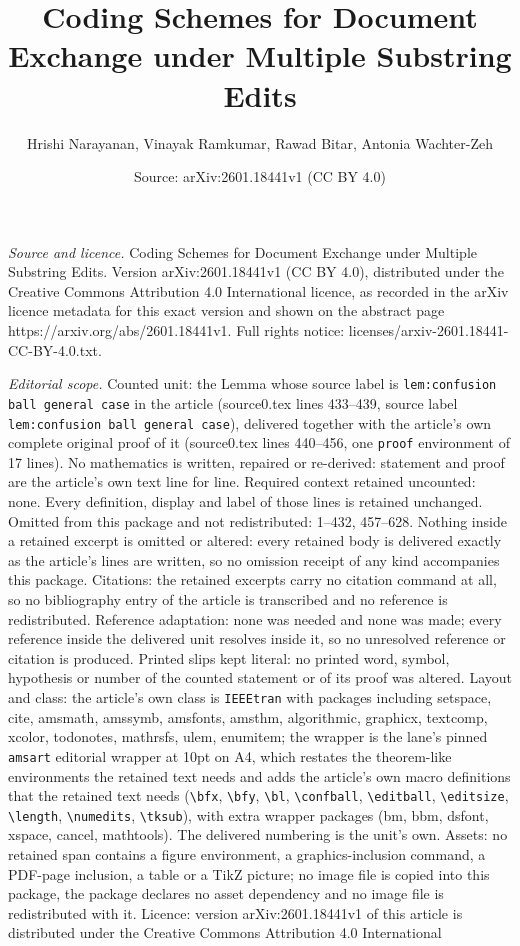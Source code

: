 \documentclass[10pt,a4paper]{amsart}
\title[Coding Schemes for Document Exchange under Multiple Substrin]{Coding Schemes for Document Exchange under Multiple Substring Edits}
\author{Hrishi Narayanan, Vinayak Ramkumar, Rawad Bitar, Antonia Wachter-Zeh}
\date{Source: arXiv:2601.18441v1 (CC BY 4.0)}
\begin{document}
\maketitle

\noindent\emph{Source and licence.} Coding Schemes for Document Exchange under Multiple Substring Edits. Version arXiv:2601.18441v1 (CC BY 4.0), distributed under the Creative Commons Attribution 4.0 International licence, as recorded in the arXiv licence metadata for this exact version and shown on the abstract page https://arxiv.org/abs/2601.18441v1. Full rights notice: licenses/arxiv-2601.18441-CC-BY-4.0.txt.\par\smallskip

\noindent\textit{Editorial scope.} Counted unit: the Lemma whose source label is \texttt{lem:confusion ball general case} in the article (source0.tex lines 433--439, source label \texttt{lem:confusion ball general case}), delivered together with the article's own complete original proof of it (source0.tex lines 440--456, one \texttt{proof} environment of 17 lines). No mathematics is written, repaired or re-derived: statement and proof are the article's own text line for line. Required context retained uncounted: none. Every definition, display and label of those lines is retained unchanged. Omitted from this package and not redistributed: 1--432, 457--628. Nothing inside a retained excerpt is omitted or altered: every retained body is delivered exactly as the article's lines are written, so no omission receipt of any kind accompanies this package. Citations: the retained excerpts carry no citation command at all, so no bibliography entry of the article is transcribed and no reference is redistributed. Reference adaptation: none was needed and none was made; every reference inside the delivered unit resolves inside it, so no unresolved reference or citation is produced. Printed slips kept literal: no printed word, symbol, hypothesis or number of the counted statement or of its proof was altered. Layout and class: the article's own class is \texttt{IEEEtran} with packages including setspace, cite, amsmath, amssymb, amsfonts, amsthm, algorithmic, graphicx, textcomp, xcolor, todonotes, mathrsfs, ulem, enumitem; the wrapper is the lane's pinned \texttt{amsart} editorial wrapper at 10pt on A4, which restates the theorem-like environments the retained text needs and adds the article's own macro definitions that the retained text needs (\texttt{\textbackslash bfx}, \texttt{\textbackslash bfy}, \texttt{\textbackslash bl}, \texttt{\textbackslash confball}, \texttt{\textbackslash editball}, \texttt{\textbackslash editsize}, \texttt{\textbackslash length}, \texttt{\textbackslash numedits}, \texttt{\textbackslash tksub}), with extra wrapper packages (bm, bbm, dsfont, xspace, cancel, mathtools). The delivered numbering is the unit's own. Assets: no retained span contains a figure environment, a graphics-inclusion command, a PDF-page inclusion, a table or a TikZ picture; no image file is copied into this package, the package declares no asset dependency and no image file is redistributed with it. Licence: version arXiv:2601.18441v1 of this article is distributed under the Creative Commons Attribution 4.0 International 
\end{document}
